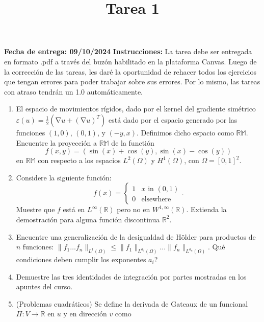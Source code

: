 \documentclass{article}
\title{Tarea 1}
\date{}
\DeclareMathOperator{\grad}{\nabla}
\newcommand{\R}{\mathbb{R}}
\begin{document}
\maketitle
\hfill \textbf{Fecha de entrega: 09/10/2024}
\textbf{Instrucciones: } La tarea debe ser entregada en formato .pdf a través del buzón habilitado en la plataforma Canvas. Luego de la corrección de las tareas, les daré la oportunidad de rehacer todos los ejercicios que tengan errores para poder trabajar sobre sus errores. Por lo mismo, las tareas con atraso tendrán un 1.0 automáticamente. 

\begin{enumerate}
    \item El espacio de movimientos rígidos, dado por el kernel del gradiente simétrico $\varepsilon(u) = \frac 1 2 \left( \grad u + (\grad u)^T \right)$ está dado por el espacio generado por las funciones $(1,0)$, $(0,1)$, y $(-y, x)$. Definimos dicho espacio como $\mathbb{RM}$. Encuentre la proyección a $\mathbb{RM}$ de la functión 
        $$ f(x,y) = (\sin(x) + \cos(y), \sin(x) - \cos(y)) $$
    en $\mathbb{RM}$ con respecto a los espacios $L^2(\Omega)$ y $H^1(\Omega)$, con $\Omega=[0,1]^2$.
    \item Considere la siguiente función: 
        $$ f(x) = \begin{cases}
                        1 & \text{$x$ in $(0,1)$} \\
                        0 & \text{elsewhere}
                    \end{cases}. $$
    Muestre que $f$ está en $L^\infty(\R)$ pero no en $W^{1,\infty}(\R)$. Extienda la demostración para alguna función discontinua $\R^2$. 
    \item Encuentre una generalización de la desigualdad de Hölder para productos de $n$ funciones: $\| f_1 \hdots f_n \|_{L^1(\Omega)} \leq \| f_1\|_{L^{a_1}(\Omega)} \hdots \| f_n \|_{L^{a_n}(\Omega)}$. Qué condiciones deben cumplir los exponentes $a_i$? 
    \item Demuestre las tres identidades de integración por partes mostradas en los apuntes del curso.
    \item (Problemas cuadráticos) Se define la derivada de Gateaux de un funcional $\Pi: V \to \R$ en $u$ y en dirección $v$ como

\end{enumerate}
\end{document}
